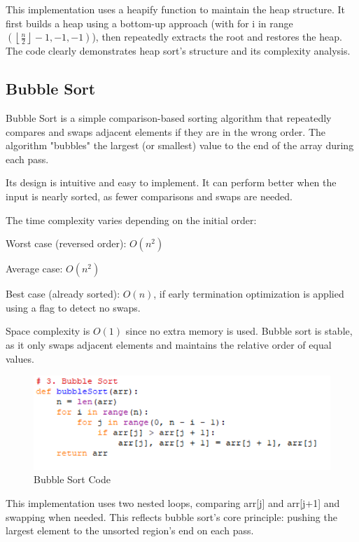 \documentclass[sigconf]{acmart}
\begin{document}
This implementation uses a heapify function to maintain the heap structure. It first builds a heap using a bottom-up approach (with for i in range$(\left\lfloor \frac{n}{2} \right\rfloor - 1, -1, -1)$), then repeatedly extracts the root and restores the heap. The code clearly demonstrates heap sort's structure and its complexity analysis.


\subsection{Bubble Sort}
Bubble Sort is a simple comparison-based sorting algorithm that repeatedly compares and swaps adjacent elements if they are in the wrong order. The algorithm "bubbles" the largest (or smallest) value to the end of the array during each pass.

Its design is intuitive and easy to implement. It can perform better when the input is nearly sorted, as fewer comparisons and swaps are needed.

The time complexity varies depending on the initial order:

Worst case (reversed order): $O(n^2)$

Average case: $O(n^2)$

Best case (already sorted): $O(n)$, if early termination optimization is applied using a flag to detect no swaps.

Space complexity is $O(1)$ since no extra memory is used. Bubble sort is stable, as it only swaps adjacent elements and maintains the relative order of equal values.

\begin{figure}[H]
\centering
\includegraphics[width=0.85\linewidth]{figures/003.pdf}
\vspace{-0.3cm}
\caption{Bubble Sort Code}  
\vspace{-0.35cm}
\label{fig:proportion}
\end{figure}

This implementation uses two nested loops, comparing arr[j] and arr[j+1] and swapping when needed. This reflects bubble sort's core principle: pushing the largest element to the unsorted region's end on each pass.
\end{document}
